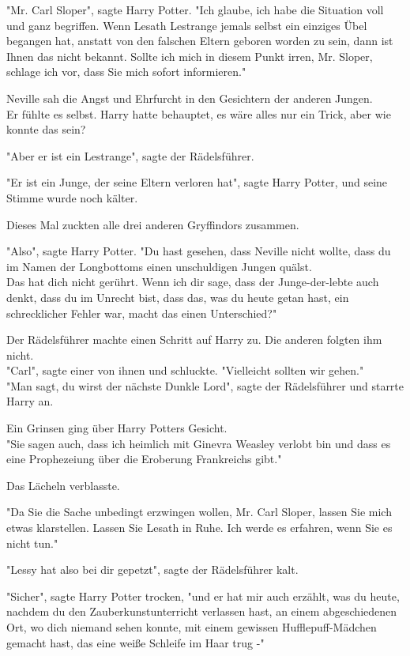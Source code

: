 {"Mr. Carl Sloper", sagte Harry Potter. "Ich glaube, ich habe die Situation voll und ganz begriffen. Wenn Lesath Lestrange jemals selbst ein einziges Übel begangen hat, anstatt von den falschen Eltern geboren worden zu sein, dann ist Ihnen das nicht bekannt. Sollte ich mich in diesem Punkt irren, Mr. Sloper, schlage ich vor, dass Sie mich sofort informieren."

Neville sah die Angst und Ehrfurcht in den Gesichtern der anderen Jungen.\\ Er fühlte es selbst. Harry hatte behauptet, es wäre alles nur ein Trick, aber wie konnte das sein?

"Aber er ist ein Lestrange", sagte der Rädelsführer.

"Er ist ein Junge, der seine Eltern verloren hat", sagte Harry Potter, und seine Stimme wurde noch kälter.

Dieses Mal zuckten alle drei anderen Gryffindors zusammen.

"Also", sagte Harry Potter. "Du hast gesehen, dass Neville nicht wollte, dass du im Namen der Longbottoms einen unschuldigen Jungen quälst.\\ Das hat dich nicht gerührt. Wenn ich dir sage, dass der Junge-der-lebte auch denkt, dass du im Unrecht bist, dass das, was du heute getan hast, ein schrecklicher Fehler war, macht das einen Unterschied?"

Der Rädelsführer machte einen Schritt auf Harry zu. Die anderen folgten ihm nicht.\\ "Carl", sagte einer von ihnen und schluckte. "Vielleicht sollten wir gehen."\\ "Man sagt, du wirst der nächste Dunkle Lord", sagte der Rädelsführer und starrte Harry an.

Ein Grinsen ging über Harry Potters Gesicht.\\ "Sie sagen auch, dass ich heimlich mit Ginevra Weasley verlobt bin und dass es eine Prophezeiung über die Eroberung Frankreichs gibt."

Das Lächeln verblasste.

"Da Sie die Sache unbedingt erzwingen wollen, Mr. Carl Sloper, lassen Sie mich etwas klarstellen. Lassen Sie Lesath in Ruhe. Ich werde es erfahren, wenn Sie es nicht tun."

"Lessy hat also bei dir gepetzt", sagte der Rädelsführer kalt.

"Sicher", sagte Harry Potter trocken, "und er hat mir auch erzählt, was du heute, nachdem du den Zauberkunstunterricht verlassen hast, an einem abgeschiedenen Ort, wo dich niemand sehen konnte, mit einem gewissen Hufflepuff-Mädchen gemacht hast, das eine weiße Schleife im Haar trug -"

}
